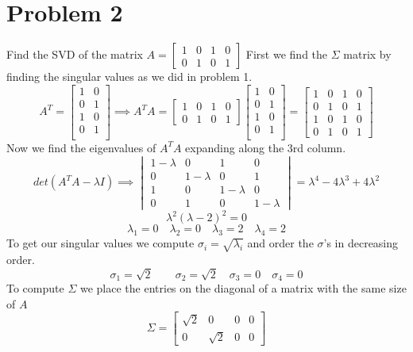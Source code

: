 \documentclass{article}
\begin{document}
\section*{Problem 2}
Find the SVD of the matrix
$A
=
\begin{bmatrix}
1 & 0 & 1 & 0 \\
0 & 1 & 0 & 1
\end{bmatrix}
$
\newline
First we find the $\Sigma$ matrix by finding the singular values as we did in problem 1.
$$
A^T
=
\begin{bmatrix}
1 & 0 \\
0 & 1 \\
1 & 0 \\
0 & 1 \\
\end{bmatrix}
\implies
A^TA
=
\begin{bmatrix}
1 & 0 & 1 & 0 \\
0 & 1 & 0 & 1
\end{bmatrix}
\begin{bmatrix}
1 & 0 \\
0 & 1 \\
1 & 0 \\
0 & 1 \\
\end{bmatrix}
=
\begin{bmatrix}
1 & 0 & 1 & 0 \\
0 & 1 & 0 & 1 \\
1 & 0 & 1 & 0 \\
0 & 1 & 0 & 1
\end{bmatrix}
$$
Now we find the eigenvalues of $A^TA$ expanding along the 3rd column.
$$
det(A^TA - \lambda I)
\implies
\begin{vmatrix}
1-\lambda & 0 & 1 & 0 \\
0 & 1-\lambda & 0 & 1 \\
1 & 0 & 1-\lambda & 0 \\
0 & 1 & 0 & 1-\lambda
\end{vmatrix}
= \lambda ^4-4 \lambda ^3+4 \lambda ^2
$$
$$
\lambda^2 (\lambda-2)^2 = 0
$$
$$ \lambda_1 = 0 \quad \lambda_2 = 0 \quad \lambda_3 = 2 \quad \lambda_4 = 2 $$
To get our singular values we compute $\sigma_i = \sqrt{\lambda_i}$ and order the $\sigma$'s in decreasing order.
$$\sigma_1 = \sqrt{2} \qquad \sigma_2 = \sqrt{2} \quad \sigma_3 = 0 \quad \sigma_4 = 0 $$
To compute $\Sigma$ we place the entries on the diagonal of a matrix with the same size of $A$
$$
\Sigma
=
\begin{bmatrix}
\sqrt{2} & 0 & 0 & 0 \\
0 & \sqrt{2} & 0 & 0
\end{bmatrix}
$$
\end{document}
